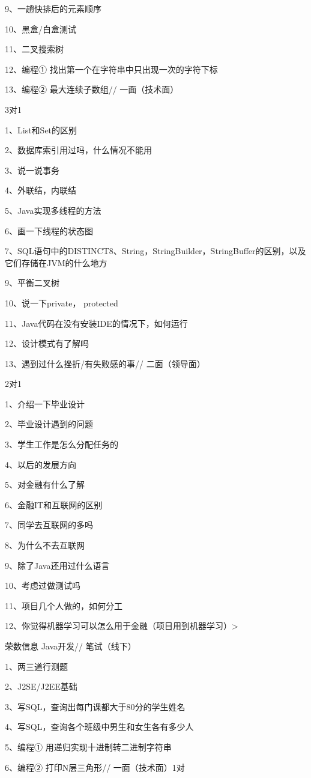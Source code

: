 \documentclass[UTF8]{ctexart}
\begin{document}
9、一趟快排后的元素顺序

10、黑盒/白盒测试

11、二叉搜索树

12、编程① 找出第一个在字符串中只出现一次的字符下标

13、编程② 最大连续子数组// 一面（技术面）

3对1

1、List和Set的区别

2、数据库索引用过吗，什么情况不能用

3、说一说事务

4、外联结，内联结

5、Java实现多线程的方法

6、画一下线程的状态图

7、SQL语句中的DISTINCT8、String，StringBuilder，StringBuffer的区别，以及它们存储在JVM的什么地方

9、平衡二叉树

10、说一下private， protected

11、Java代码在没有安装IDE的情况下，如何运行

12、设计模式有了解吗

13、遇到过什么挫折/有失败感的事// 二面（领导面）

2对1

1、介绍一下毕业设计

2、毕业设计遇到的问题

3、学生工作是怎么分配任务的

4、以后的发展方向

5、对金融有什么了解

6、金融IT和互联网的区别

7、同学去互联网的多吗

8、为什么不去互联网

9、除了Java还用过什么语言

10、考虑过做测试吗

11、项目几个人做的，如何分工

12、你觉得机器学习可以怎么用于金融（项目用到机器学习）>

 荣数信息 Java开发// 笔试（线下）

 1、两三道行测题

 2、J2SE/J2EE基础

 3、写SQL，查询出每门课都大于80分的学生姓名

 4、写SQL，查询各个班级中男生和女生各有多少人

 5、编程① 用递归实现十进制转二进制字符串

 6、编程② 打印N层三角形// 一面（技术面）1对
\end{document}
